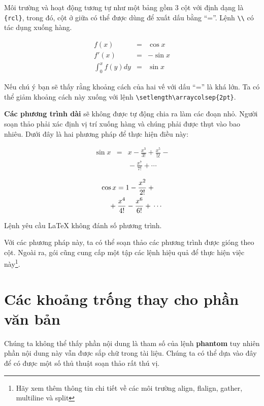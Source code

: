 Môi trường  và  hoạt động tương tự như một bảng gồm 3 cột với định dạng là \verb|{rcl}|, trong đó, cột ở giữa có thể được dùng để xuất dấu bằng ``=''. Lệnh \verb|\\| có tác dụng xuống hàng.
\begin{example}
\begin{eqnarray}
f(x) & = & \cos x     \\
f'(x) & = & -\sin x   \\
\int_{0}^{x} f(y)dy &
 = & \sin x
\end{eqnarray}
\end{example}
Nếu chú ý bạn sẽ thấy rằng khoảng cách của hai vế với dấu ``='' là khá lớn. Ta có thể giảm khoảng cách này xuống với lệnh
\verb|\setlength\arraycolsep{2pt}|.

\textbf{Các phương trình dài} sẽ không được tự động chia ra làm các đoạn nhỏ. Người soạn thảo phải xác định vị trí xuống hàng và chúng phải được thụt vào bao nhiêu. Dưới đây là hai phương pháp để thực hiện điều này:
\begin{example}
{\setlength\arraycolsep{2pt}
\begin{eqnarray}
\sin x & = & x -\frac{x^{3}}{3!}
     + \frac{x^{5}}{5!}-{}
                    \nonumber \\
 & & {}-\frac{x^{7}}{7!}+{}\cdots
\end{eqnarray}}
\end{example}

\begin{example}
\begin{eqnarray}
\lefteqn{ \cos x = 1
     -\frac{x^{2}}{2!} +{} }
                    \nonumber\\
 & & {}+\frac{x^{4}}{4!}
     -\frac{x^{6}}{6!}+{}\cdots
\end{eqnarray}
\end{example}

\noindent Lệnh  yêu cầu \LaTeX{} không đánh số phương trình.

Với các phương pháp này, ta có thể soạn thảo các phương trình được gióng theo cột. Ngoài ra, gói  cũng cung cấp một tập các lệnh hiệu quả để thực hiện việc này\footnote{Hãy xem thêm thông tin chi tiết về các môi trường \textrm{align,  flalign, gather, multiline và split}}.

\section{Các khoảng trống thay cho phần văn bản}
Chúng ta không thể thấy phần nội dung là tham số của lệnh \textbf{phantom} tuy nhiên phần nội dung này vẫn được sắp chữ trong tài liệu. Chúng ta có thể dựa vào đây để có được một số thủ thuật soạn thảo rất thú vị.

